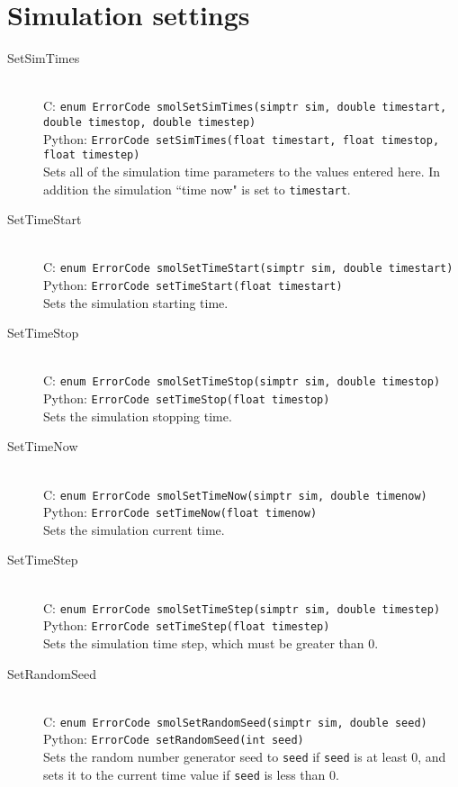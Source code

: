 \documentclass {book}
\newcommand {\ttt} {\texttt}
\begin{document}
\section{Simulation settings}

\begin{description}

\item[SetSimTimes]
\hfill \\
C: \ttt{enum ErrorCode smolSetSimTimes(simptr sim, double timestart, double timestop, double timestep)}\\
Python: \ttt{ErrorCode setSimTimes(float timestart, float timestop, float timestep)}\\
Sets all of the simulation time parameters to the values entered here. In addition the simulation ``time now" is set to \ttt{timestart}.

\item[SetTimeStart]
\hfill \\
C: \ttt{enum ErrorCode smolSetTimeStart(simptr sim, double timestart)}\\
Python: \ttt{ErrorCode setTimeStart(float timestart)}\\
Sets the simulation starting time.

\item[SetTimeStop]
\hfill \\
C: \ttt{enum ErrorCode smolSetTimeStop(simptr sim, double timestop)}\\
Python: \ttt{ErrorCode setTimeStop(float timestop)}\\
Sets the simulation stopping time.

\item[SetTimeNow]
\hfill \\
C: \ttt{enum ErrorCode smolSetTimeNow(simptr sim, double timenow)}\\
Python: \ttt{ErrorCode setTimeNow(float timenow)}\\
Sets the simulation current time.

\item[SetTimeStep]
\hfill \\
C: \ttt{enum ErrorCode smolSetTimeStep(simptr sim, double timestep)}\\
Python: \ttt{ErrorCode setTimeStep(float timestep)}\\
Sets the simulation time step, which must be greater than 0.

\item[SetRandomSeed]
\hfill \\
C: \ttt{enum ErrorCode smolSetRandomSeed(simptr sim, double seed)}\\
Python: \ttt{ErrorCode setRandomSeed(int seed)}\\
Sets the random number generator seed to \ttt{seed} if \ttt{seed} is at least 0, and sets it to the current time value if \ttt{seed} is less than 0.


\end{description}
\end{document}

